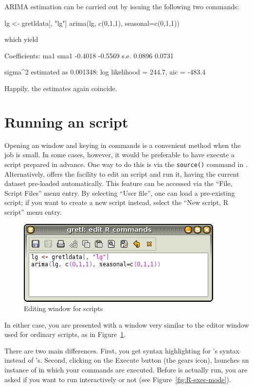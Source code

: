 ARIMA estimation can be carried out by issuing the following two
 commands:
\begin{code}
lg <- gretldata[, "lg"]
arima(lg, c(0,1,1), seasonal=c(0,1,1))
\end{code}

which yield

\begin{code}
Coefficients:
          ma1     sma1
      -0.4018  -0.5569
s.e.   0.0896   0.0731

sigma^2 estimated as 0.001348:  log likelihood = 244.7,  aic = -483.4
\end{code}

Happily, the estimates again coincide.

\section{Running an  script}
\label{sec:R-scripts}

Opening an  window and keying in commands is a convenient
method when the job is small. In some cases, however, it would be
preferable to have  execute a script prepared in advance. 
One way to do this is via the \texttt{source()} command in
.  Alternatively,  offers the facility to edit an
 script and run it, having the current dataset pre-loaded
automatically. This feature can be accessed via the ``File, Script
Files'' menu entry.  By selecting ``User file'', one can load a
pre-existing  script; if you want to create a new script
instead, select the ``New script, R script'' menu entry.

\begin{figure}[htbp]
  \centering
  \includegraphics[scale=0.7]{figures/R-edit1}
  \caption{Editing window for  scripts}
  \label{fig:R-edit1}
\end{figure}
In either case, you are presented with a window very similar to
the editor window used for ordinary  scripts, as in
Figure~\ref{fig:R-edit1}.

There are two main differences.  First, you get syntax highlighting for
's syntax instead of 's. Second, clicking on the
Execute button (the gears icon), launches an instance of  in
which your commands are executed.  Before  is actually run, you
are asked if you want to run  interactively or not (see
Figure~\ref{fig:R-exec-mode}).

